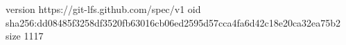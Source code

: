 version https://git-lfs.github.com/spec/v1
oid sha256:dd08485f3258df3520fb63016cb06ed2595d57cca4fa6d42c18e20ca32ea75b2
size 1117
